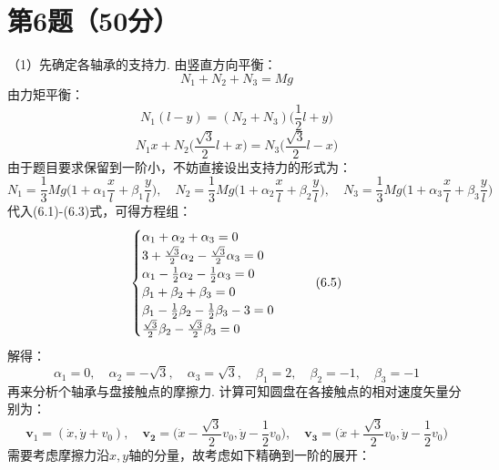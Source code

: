 \documentclass{ctexart}
\begin{document}
\section*{第6题（50分）}
\noindent （1）先确定各轴承的支持力. 由竖直方向平衡：
\begin{equation}
  N_1+N_2+N_3=Mg \tag{6.1}
\end{equation}
由力矩平衡：
\begin{equation}
  N_1(l-y)=(N_2+N_3)\Big(\frac{1}{2}l+y\Big) \tag{6.2}
\end{equation}
\begin{equation}
  N_1x+N_2\Big(\frac{\sqrt{3}}{2}l+x\Big)=N_3\Big(\frac{\sqrt{3}}{2}l-x\Big) \tag{6.3}
\end{equation}
由于题目要求保留到一阶小，不妨直接设出支持力的形式为：
\begin{equation}
  N_1=\frac{1}{3}Mg\Big(1+\alpha_1\frac{x}{l}+\beta_1\frac{y}{l}\Big),\quad N_2=\frac{1}{3}Mg\Big(1+\alpha_2\frac{x}{l}+\beta_2\frac{y}{l}\Big),\quad N_3=\frac{1}{3}Mg\Big(1+\alpha_3\frac{x}{l}+\beta_3\frac{y}{l}\Big) \tag{6.4}
\end{equation}
代入(6.1)-(6.3)式，可得方程组：
\begin{equation}
  \begin{cases}
    \alpha_1+\alpha_2+\alpha_3=0 \notag\\
    3+\frac{\sqrt{3}}{2}\alpha_2-\frac{\sqrt{3}}{2}\alpha_3=0 \notag\\
    \alpha_1-\frac{1}{2}\alpha_2-\frac{1}{2}\alpha_3=0 \notag\\
    \beta_1+\beta_2+\beta_3=0 \notag\\
    \beta_1-\frac{1}{2}\beta_2-\frac{1}{2}\beta_3-3=0 \notag\\
    \frac{\sqrt{3}}{2}\beta_2-\frac{\sqrt{3}}{2}\beta_3=0 \notag
  \end{cases} \tag{6.5}
\end{equation}
解得：
\begin{equation}
  \alpha_1=0,\quad \alpha_2=-\sqrt{3},\quad \alpha_3=\sqrt{3},\quad \beta_1=2,\quad \beta_2=-1,\quad \beta_3=-1 \tag{6.6}
\end{equation}
再来分析个轴承与盘接触点的摩擦力. 计算可知圆盘在各接触点的相对速度矢量分别为：
\begin{equation}
  \bm{v}_1=(\dot{x},\dot{y}+v_0 ),\quad \bm{v_2}=\Big( \dot{x}-\frac{\sqrt{3}}{2}v_0,\dot{y}-\frac{1}{2}v_0\Big),\quad 
  \bm{v_3}=\Big( \dot{x}+\frac{\sqrt{3}}{2}v_0,\dot{y}-\frac{1}{2}v_0\Big) \tag{6.7}
\end{equation}
需要考虑摩擦力沿$x,y$轴的分量，故考虑如下精确到一阶的展开：
\end{document}
